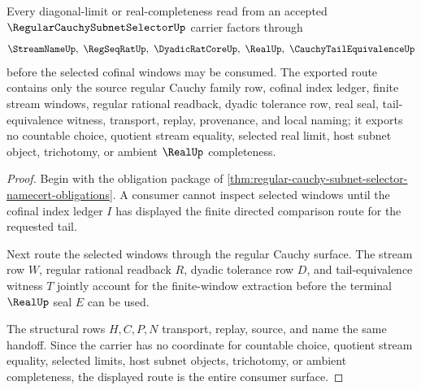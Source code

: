\begin{theorem}
\label{thm:regular-cauchy-subnet-selector-handoff}
Every diagonal-limit or real-completeness read from an accepted $\RegularCauchySubnetSelectorUp$ carrier factors through
$$
\StreamNameUp,\ \RegSeqRatUp,\ \DyadicRatCoreUp,\ \RealUp,\ \CauchyTailEquivalenceUp
$$
before the selected cofinal windows may be consumed. The exported route contains only the source regular Cauchy family row, cofinal index ledger, finite stream windows, regular rational readback, dyadic tolerance row, real seal, tail-equivalence witness, transport, replay, provenance, and local naming; it exports no countable choice, quotient stream equality, selected real limit, host subnet object, trichotomy, or ambient $\RealUp$ completeness.
\end{theorem}
\begin{proof}
Begin with the obligation package of \autoref{thm:regular-cauchy-subnet-selector-namecert-obligations}. A consumer cannot inspect selected windows until the cofinal index ledger $I$ has displayed the finite directed comparison route for the requested tail.

Next route the selected windows through the regular Cauchy surface. The stream row $W$, regular rational readback $R$, dyadic tolerance row $D$, and tail-equivalence witness $T$ jointly account for the finite-window extraction before the terminal $\RealUp$ seal $E$ can be used.

The structural rows $H,C,P,N$ transport, replay, source, and name the same handoff. Since the carrier has no coordinate for countable choice, quotient stream equality, selected limits, host subnet objects, trichotomy, or ambient completeness, the displayed route is the entire consumer surface.
\end{proof}



